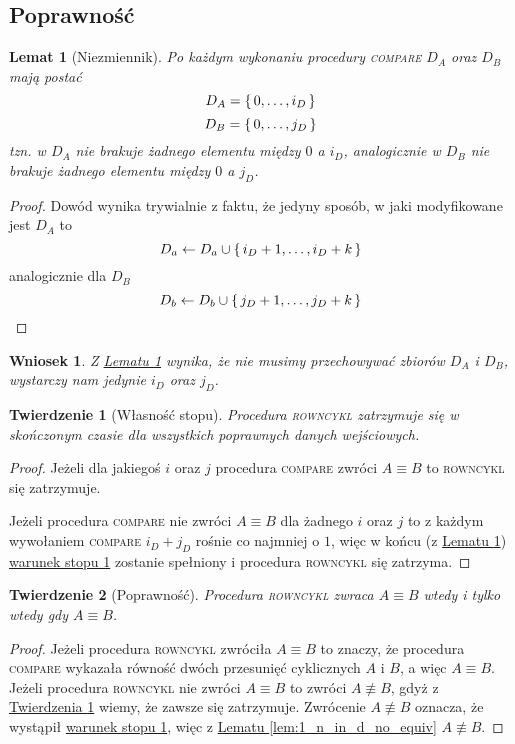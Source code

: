 \documentclass{scrartcl}
\theoremstyle{definition}
\theoremstyle{remark}
\theoremstyle{plain}
\theoremstyle{remark}
\theoremstyle{plain}
\newtheorem{lemma_niezmiennik}[lemma_equiv_if_lex_min_eq]{Lemat}
\newtheorem{not_storing_sets}{Wniosek}[section]
\newtheorem{termination_theorem}{Twierdzenie}[section]
\newtheorem{correctness_theorem}[termination_theorem]{Twierdzenie}
\theoremstyle{definition}
\theoremstyle{plain}
\begin{document}
\subsection{Poprawność}
\begin{lemma_niezmiennik}[Niezmiennik]
	\label{lem:niezmiennik}
	Po każdym wykonaniu procedury \textnormal{\textsc{compare}}
	\(D_A\) oraz \(D_B\) mają postać
	\[D_A=\set{0,\dots,i_D}\]
	\[D_B=\set{0,\dots,j_D}\]
	tzn. w \(D_A\) nie brakuje żadnego elementu
	między \(0\) a \(i_D\), analogicznie w \(D_B\)
	nie brakuje
	żadnego elementu między \(0\) a \(j_D\).
\end{lemma_niezmiennik}
\begin{proof}
	Dowód wynika trywialnie z faktu, że
	jedyny sposób, w jaki modyfikowane jest \(D_A\)
	to \[D_a\gets D_a\cup\set{i_D+1,\dots,i_D+k}\]
	analogicznie dla \(D_B\)
	\[D_b\gets D_b\cup\set{j_D+1,\dots,j_D+k}\]
\end{proof}
\begin{not_storing_sets}
	\label{cor:not_storing_sets}
	Z \hyperref[lem:niezmiennik]{Lematu \ref*{lem:niezmiennik}}
	wynika, że nie musimy przechowywać zbiorów \(D_A\) i \(D_B\),
	wystarczy nam jedynie \(i_D\) oraz \(j_D\).
\end{not_storing_sets}
\begin{termination_theorem}[Własność stopu]
	\label{thm:termination}
	Procedura \textnormal{\textsc{rowncykl}}
	zatrzymuje się w skończonym czasie dla wszystkich
	poprawnych danych wejściowych.
\end{termination_theorem}
\begin{proof}
	Jeżeli dla jakiegoś \(i\) oraz \(j\) procedura
	\textsc{compare} zwróci \(A\equiv B\) to
	\textsc{rowncykl} się zatrzymuje.

	Jeżeli procedura \textsc{compare} nie zwróci \(A\equiv B\)
	dla żadnego \(i\) oraz \(j\) to z każdym wywołaniem
	\textsc{compare} \(i_D+j_D\) rośnie co najmniej o \(1\),
	więc w końcu
	(z \hyperref[lem:niezmiennik]{Lematu \ref*{lem:niezmiennik}})
	\hyperref[term_cond_1]{warunek stopu 1}
	zostanie spełniony i procedura
	\textsc{rowncykl} się zatrzyma.
\end{proof}
\begin{correctness_theorem}[Poprawność]
	\label{thm:correctness}
	Procedura \textnormal{\textsc{rowncykl}}
	zwraca \(A\equiv B\) wtedy i tylko wtedy
	gdy \(A\equiv B\).
\end{correctness_theorem}
\begin{proof}
	Jeżeli procedura \textsc{rowncykl} zwróciła \(A\equiv B\)
	to znaczy, że procedura \textsc{compare}
	wykazała równość dwóch przesunięć cyklicznych \(A\) i \(B\),
	a więc \(A\equiv B\).
	Jeżeli procedura \textsc{rowncykl} nie zwróci \(A\equiv B\)
	to zwróci \(A\not\equiv B\), gdyż z
	\hyperref[thm:termination]{Twierdzenia \ref*{thm:termination}}
	wiemy, że zawsze się zatrzymuje.
	Zwrócenie \(A\not\equiv B\) oznacza, że wystąpił
	\hyperref[term_cond_1]{warunek stopu 1},
	więc z \hyperref[lem:1_n_in_d_no_equiv]
	{Lematu \ref*{lem:1_n_in_d_no_equiv}} \(A\not\equiv B\).
\end{proof}
\pagebreak
\end{document}
